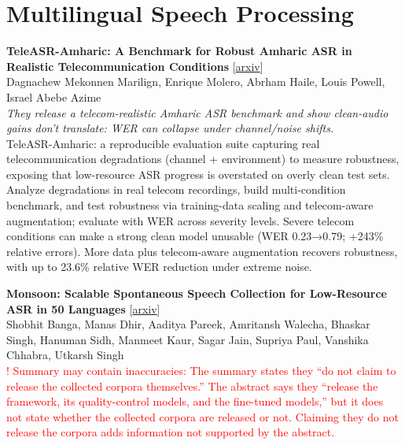 \documentclass[12pt,letterpaper]{article}
\begin{document}
\medskip


\section*{Multilingual Speech Processing}

{\small\textbf{TeleASR-Amharic: A Benchmark for Robust Amharic ASR in Realistic Telecommunication Conditions}} {\scriptsize[\href{https://arxiv.org/abs/2610.26448}{arxiv}]}\\
{\scriptsize Dagnachew Mekonnen Marilign, Enrique Molero, Abrham Haile, Louis Powell, Israel Abebe Azime}\\

{\small\textit{They release a telecom-realistic Amharic ASR benchmark and show clean-audio gains don't translate: WER can collapse under channel/noise shifts.}}\\[1pt]
{\footnotesize TeleASR-Amharic: a reproducible evaluation suite capturing real telecommunication degradations (channel + environment) to measure robustness, exposing that low-resource ASR progress is overstated on overly clean test sets. Analyze degradations in real telecom recordings, build multi-condition benchmark, and test robustness via training-data scaling and telecom-aware augmentation; evaluate with WER across severity levels. Severe telecom conditions can make a strong clean model unusable (WER 0.23→0.79; +243\% relative errors). More data plus telecom-aware augmentation recovers robustness, with up to 23.6\% relative WER reduction under extreme noise.}

\medskip

{\small\textbf{Monsoon: Scalable Spontaneous Speech Collection for Low-Resource ASR in 50 Languages}} {\scriptsize[\href{https://arxiv.org/abs/2610.26776}{arxiv}]}\\
{\scriptsize Shobhit Banga, Manas Dhir, Aaditya Pareek, Amritansh Walecha, Bhaskar Singh, Hanuman Sidh, Manmeet Kaur, Sagar Jain, Supriya Paul, Vanshika Chhabra, Utkarsh Singh}\\

{\scriptsize\textcolor{red}{! Summary may contain inaccuracies: The summary states they ``do not claim to release the collected corpora themselves.'' The abstract says they ``release the framework, its quality-control models, and the fine-tuned models,'' but it does not state whether the collected corpora are released or not. Claiming they do not release the corpora adds information not supported by the abstract.}}\\[1pt]
\end{document}
